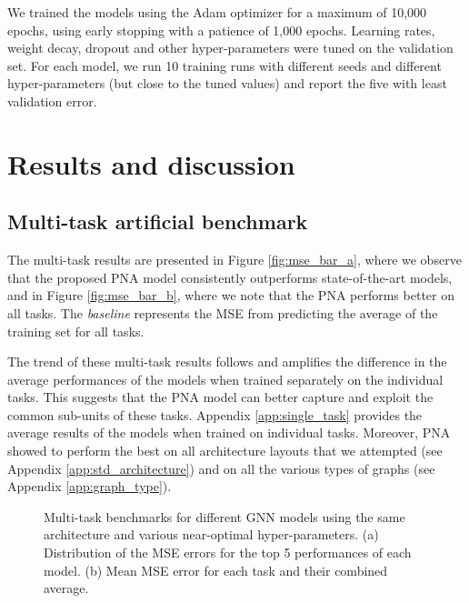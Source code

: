 \documentclass{article}
\begin{document}
We trained the models using the Adam optimizer for a maximum of 10,000 epochs, using early stopping with a patience of 1,000 epochs. Learning rates, weight decay, dropout and other hyper-parameters were tuned on the validation set. For each model, we run 10 training runs with different seeds and different hyper-parameters (but close to the tuned values) and report the five with least validation error.

\section{Results and discussion}

\subsection{Multi-task artificial benchmark}

The multi-task results are presented in Figure \ref{fig:mse_bar_a}, where we observe that the proposed PNA model consistently outperforms state-of-the-art models, and in Figure \ref{fig:mse_bar_b}, where we note that the PNA performs better on all tasks. The \textit{baseline} represents the MSE from predicting the average of the training set for all tasks. 

The trend of these multi-task results follows and amplifies the difference in the average performances of the models when trained separately on the individual tasks. This suggests that the PNA model can better capture and exploit the common sub-units of these tasks. Appendix \ref{app:single_task} provides the average results of the models when trained on individual tasks. Moreover, PNA showed to perform the best on all architecture layouts that we attempted (see Appendix \ref{app:std_architecture}) and on all the various types of graphs (see Appendix \ref{app:graph_type}).





\begin{figure}[h]
\centering


\caption{Multi-task benchmarks for different GNN models using the same architecture and various near-optimal hyper-parameters. (a) Distribution of the MSE errors for the top 5 performances of each model. (b) Mean MSE error for each task and their combined average. }
\label{fig:mse_bar}
\end{figure} 
\end{document}
